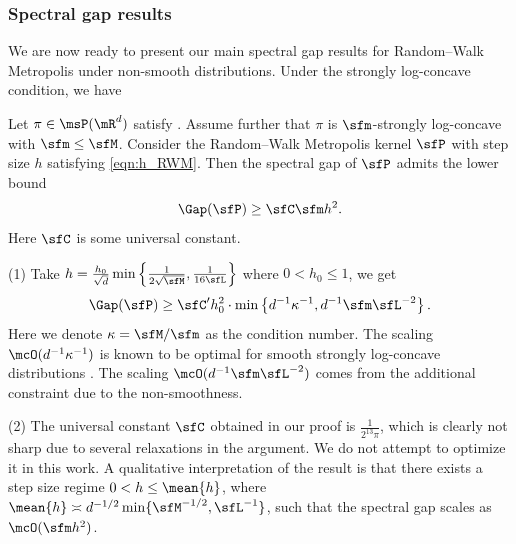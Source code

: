 \documentclass[11pt]{article}
\begin{document}
\subsubsection{Spectral gap results}
\label{sec:RWM_SpecGap}

We are now ready to present our main spectral gap results for Random--Walk Metropolis under non-smooth distributions.
%
Under the strongly log-concave condition, we have

\begin{thm}
\label{thm:SpecRWN_convex}
Let $\pi\in\msP(\mR^d)$ satisfy .
Assume further that $\pi$ is $\sfm$-strongly log-concave with $\sfm \le \sfM$.
Consider the Random--Walk Metropolis kernel $\sfP$ with step size $h$ satisfying \eqref{eqn:h_RWM}.
Then the spectral gap of $\sfP$ admits the lower bound
\begin{equation}
    \Gap (\sfP) \ge \sfC\sfm h^2.
\end{equation}
Here $\sfC$ is some universal constant.
\end{thm}

\begin{rem}
\label{rem:SpecRWM_convex}
(1) Take $h = \frac{h_0}{\sqrt{d}} \min \left\{ \frac{1}{2\sqrt{\sfM}}, \frac{1}{16\sfL} \right\} $ where $0<h_0\le 1$, we get 
\begin{equation}
    \Gap(\sfP) \ge \sfC'h_0^2 \cdot \min \left\{ d^{-1} \kappa^{-1} , d^{-1} \sfm \sfL^{-2} \right\}.
\end{equation}
Here we denote $\kappa = \sfM/\sfm$ as the condition number.
%
The scaling $\mcO(d^{-1} \kappa^{-1})$ is known to be optimal for smooth strongly log-concave distributions \citep{24-AAP2058}.
%
The scaling $\mcO(d^{-1} \sfm \sfL^{-2})$ comes from the additional constraint due to the non-smoothness. 

\noindent
(2) The universal constant $\sfC$ obtained in our proof is $\frac{1}{2^{13}\pi}$, which is clearly not sharp due to several relaxations in the argument. We do not attempt to optimize it in this work.
A qualitative interpretation of the result is that there exists a step size regime $ 0 < h \le \mean{h}$, where $\mean{h} \asymp d^{-1/2} \min\{\sfM^{-1/2}, \sfL^{-1}\}$, such that the spectral gap scales as $\mcO(\sfm h^2)$.

\end{rem}
\end{document}
